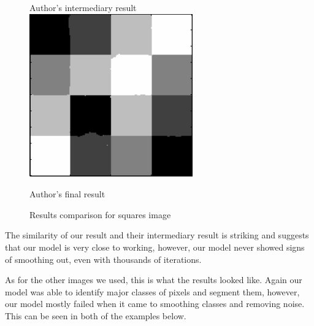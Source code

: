 \documentclass[11pt]{article}
\begin{document}
\begin{figure}[!htb]
\begin{center}
\begin{multicols}{3}
    Author's intermediary result
	\includegraphics[height = \linewidth]{squares2}\par
    Author's final result
\end{multicols}
\caption{Results comparison for squares image}
\end{center}
\end{figure}

The similarity of our result and their intermediary result is striking and suggests that our model is very close to working, however, our model never showed signs of smoothing out, even with thousands of iterations.

As for the other images we used, this is what the results looked like.
Again our model was able to identify major classes of pixels and segment them, however, our model mostly failed when it came to smoothing classes and removing noise.
This can be seen in both of the examples below.
\end{document}
